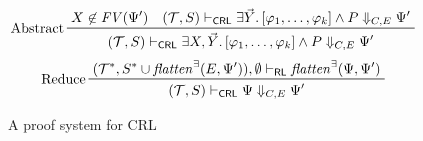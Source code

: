 \begin{figure}
\begin{align*}
    \end{align*}
    \begin{align*}
      & \prftree[l]{Abstract}
        { %
          { X \not\in \mathit{FV}(\Psi^\prime)
          }\quad
          {(\mathcal{T}, S) \provesCRL \exists \vec{Y}.\, [\varphi_1, \ldots, \varphi_k] \land P \Downarrow_{C, E} \Psi^\prime}
        }
        {(\mathcal{T}, S) \provesCRL \exists X, \vec{Y}.\, [\varphi_1, \ldots, \varphi_k] \land P \Downarrow_{C, E} \Psi^\prime}
    \end{align*}
    \begin{align*}
    & \prftree[l]{Reduce}
      {(\mathcal{T}^*, S^* \cup \mathit{flatten}^\exists(E, \Psi^\prime)), \emptyset \vdash_\RL
        \mathit{flatten}^\exists(\Psi, \Psi^\prime) }
      {(\mathcal{T}, S) \provesCRL \Psi \Downarrow_{C,E} \Psi^\prime}
    \end{align*}

    \caption{A proof system for CRL}
    \label{fig:CRLproofsystem}
\end{figure}

